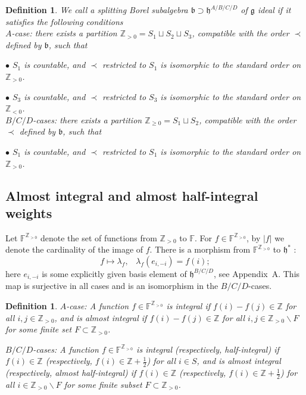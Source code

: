 \documentclass{emsprocart}
\newtheorem{definition}[theorem]{Definition}
\begin{document}
\begin{definition}We call a splitting Borel subalgebra $\mathfrak b\supset \mathfrak h^{A/B/C/D}$ of $\mathfrak g$ {\it ideal} if it satisfies the following conditions\\
$A$-case: there exists a partition $\mathbb Z_{>0}=S_1\sqcup S_2\sqcup S_3$, compatible with the order $\prec$ defined by $\mathfrak b$, such that

$\bullet$ $S_1$ is countable, and $\prec$ restricted to $S_1$ is isomorphic to the standard order on $\mathbb Z_{>0}$.

$\bullet$ $S_3$ is countable, and $\prec$ restricted to $S_3$ is isomorphic to the standard order on $\mathbb Z_{<0}$.\\
$B/C/D$-cases: there exists a partition $\mathbb Z_{\ge0}=S_1\sqcup S_2$, compatible with the order $\prec$ defined by $\mathfrak b$, such that

$\bullet$ $S_1$ is countable, and $\prec$ restricted to $S_1$ is isomorphic to the standard order on $\mathbb Z_{>0}$.
\end{definition}

\subsection{Almost integral and almost half-integral  weights}
Let $\mathbb F^{\mathbb Z_{>0}}$ denote the set of functions from $\mathbb Z_{>0}$ to $\mathbb F$. For $f\in\mathbb F^{\mathbb Z_{>0}}$, by $|f|$ we denote the cardinality of the image of $f$. There is a morphism from $\mathbb F^{\mathbb Z_{>0}}$ to $\mathfrak h^*$ :\begin{equation}f\mapsto \lambda_f,\hspace{10pt}
\lambda_f(e_{i, -i})=f(i);\end{equation}
here $e_{i, -i}$ is some explicitly given basis element of $\mathfrak h^{B/C/D}$, see Appendix~A.
This map is surjective in all cases and is an isomorphism in the $B/C/D$-cases. %

\begin{definition}$A$-case: A function $f\in\mathbb F^{\mathbb Z_{>0}}$ is {\it integral} if $f(i)-f(j)\in\mathbb Z$ for all $i, j\in {\mathbb Z_{>0}}$, and is {\it almost integral} if $f(i)-f(j)\in\mathbb Z$ for all $i, j\in{\mathbb Z_{>0}}\backslash F$ for some finite set $F\subset{\mathbb Z_{>0}}$.

$B/C/D$-cases: A function $f\in\mathbb F^{\mathbb Z_{>0}}$ is {\it integral} (respectively, {\it half-integral}) if $f(i)\in\mathbb Z$ (respectively, $f(i)\in\mathbb Z+\frac12$) for all $i\in S$, and is {\it almost integral} (respectively, {\it almost half-integral}) if $f(i)\in\mathbb Z$ (respectively, $f(i)\in\mathbb Z+\frac12$) for all $i\in{\mathbb Z_{>0}}\backslash F$ for some finite subset $F\subset\mathbb Z_{>0}$.\end{definition}
\end{document}
